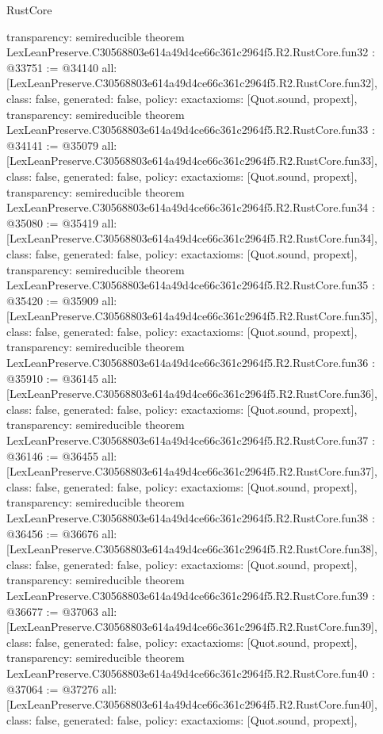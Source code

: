 \begin{lexlean}{RustCore}
\begin{coremodule}
{  transparency: semireducible
}
theorem LexLeanPreserve.C30568803e614a49d4ce66c361c2964f5.R2.RustCore.fun32 : @33751 := @34140 {
  all: [LexLeanPreserve.C30568803e614a49d4ce66c361c2964f5.R2.RustCore.fun32],
  class: false,
  generated: false,
  policy: exact{axioms: [Quot.sound, propext]},
  transparency: semireducible
}
theorem LexLeanPreserve.C30568803e614a49d4ce66c361c2964f5.R2.RustCore.fun33 : @34141 := @35079 {
  all: [LexLeanPreserve.C30568803e614a49d4ce66c361c2964f5.R2.RustCore.fun33],
  class: false,
  generated: false,
  policy: exact{axioms: [Quot.sound, propext]},
  transparency: semireducible
}
theorem LexLeanPreserve.C30568803e614a49d4ce66c361c2964f5.R2.RustCore.fun34 : @35080 := @35419 {
  all: [LexLeanPreserve.C30568803e614a49d4ce66c361c2964f5.R2.RustCore.fun34],
  class: false,
  generated: false,
  policy: exact{axioms: [Quot.sound, propext]},
  transparency: semireducible
}
theorem LexLeanPreserve.C30568803e614a49d4ce66c361c2964f5.R2.RustCore.fun35 : @35420 := @35909 {
  all: [LexLeanPreserve.C30568803e614a49d4ce66c361c2964f5.R2.RustCore.fun35],
  class: false,
  generated: false,
  policy: exact{axioms: [Quot.sound, propext]},
  transparency: semireducible
}
theorem LexLeanPreserve.C30568803e614a49d4ce66c361c2964f5.R2.RustCore.fun36 : @35910 := @36145 {
  all: [LexLeanPreserve.C30568803e614a49d4ce66c361c2964f5.R2.RustCore.fun36],
  class: false,
  generated: false,
  policy: exact{axioms: [Quot.sound, propext]},
  transparency: semireducible
}
theorem LexLeanPreserve.C30568803e614a49d4ce66c361c2964f5.R2.RustCore.fun37 : @36146 := @36455 {
  all: [LexLeanPreserve.C30568803e614a49d4ce66c361c2964f5.R2.RustCore.fun37],
  class: false,
  generated: false,
  policy: exact{axioms: [Quot.sound, propext]},
  transparency: semireducible
}
theorem LexLeanPreserve.C30568803e614a49d4ce66c361c2964f5.R2.RustCore.fun38 : @36456 := @36676 {
  all: [LexLeanPreserve.C30568803e614a49d4ce66c361c2964f5.R2.RustCore.fun38],
  class: false,
  generated: false,
  policy: exact{axioms: [Quot.sound, propext]},
  transparency: semireducible
}
theorem LexLeanPreserve.C30568803e614a49d4ce66c361c2964f5.R2.RustCore.fun39 : @36677 := @37063 {
  all: [LexLeanPreserve.C30568803e614a49d4ce66c361c2964f5.R2.RustCore.fun39],
  class: false,
  generated: false,
  policy: exact{axioms: [Quot.sound, propext]},
  transparency: semireducible
}
theorem LexLeanPreserve.C30568803e614a49d4ce66c361c2964f5.R2.RustCore.fun40 : @37064 := @37276 {
  all: [LexLeanPreserve.C30568803e614a49d4ce66c361c2964f5.R2.RustCore.fun40],
  class: false,
  generated: false,
  policy: exact{axioms: [Quot.sound, propext]},
}
\end{coremodule}
\end{lexlean}
